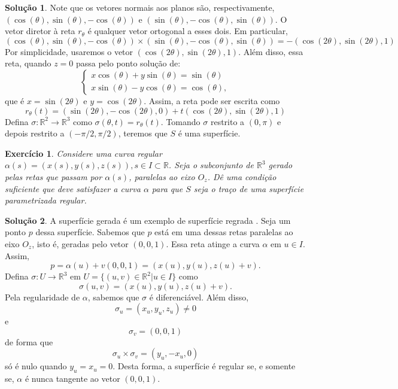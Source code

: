 \documentclass[a4paper,12pt]{article}
\newcommand{\R}{\mathbb{R}}
\theoremstyle{exer}
\newtheorem{exercise}{Exercício}
\theoremstyle{definition}
\newtheorem{solution}{Solução}
\theoremstyle{plain}
\begin{document}
\begin{solution}
    Note que os vetores normais aos planos são, respectivamente,
    $(\cos(\theta), \sin(\theta), -\cos(\theta))$ e $(\sin(\theta),
    -\cos(\theta), \sin(\theta))$. O vetor diretor à reta $r_{\theta}$ é
    qualquer vetor ortogonal a esses dois. Em particular, 
    $$
    (\cos(\theta), \sin(\theta), -\cos(\theta)) \times (\sin(\theta),
    -\cos(\theta), \sin(\theta)) = -(\cos(2\theta), \sin(2\theta), 1) 
    $$
    Por simplicidade, usaremos o vetor $(\cos(2\theta), \sin(2\theta), 1)$.
    Além disso, essa reta, quando $z = 0$ passa pelo ponto solução de:
    $$
    \begin{cases}
      x\cos(\theta) + y\sin(\theta) = \sin(\theta) \\
      x\sin(\theta) - y\cos(\theta) = \cos(\theta), 
    \end{cases}
    $$
    que é $x = \sin(2\theta)$ e $y = \cos(2\theta)$. Assim, a reta pode ser
    escrita como 
    $$
    r_{\theta}(t) = (\sin(2\theta), -\cos(2\theta), 0) + t(\cos(2\theta), \sin(2\theta), 1)
    $$
    Defina $\sigma : \R^2 \to \R^3$ como $\sigma(\theta, t) = r_{\theta}(t)$.
    Tomando $\sigma$ restrito a $(0,\pi)$ e depois restrito a $(-\pi/2,
    \pi/2)$, teremos que $S$ é uma superfície. 
\end{solution}

\begin{exercise}
    Considere uma curva regular $\alpha(s) = (x(s), y(s), z(s)), s \in I
    \subset \R$. Seja o subconjunto de $\R^3$ gerado pelas retas que passam
    por $\alpha(s)$, paralelas ao eixo $O_z$. Dê uma condição suficiente que
    deve satisfazer a curva $\alpha$ para que $S$ seja o traço de uma
    superfície parametrizada regular.
\end{exercise}

\begin{solution}
    A superfície gerada é um exemplo de superfície regrada \cite[Seção
    5.3]{pressley}. Seja um ponto $p$ dessa superfície. Sabemos que $p$ está
    em uma dessas retas paralelas ao eixo $O_z$, isto é, geradas pelo vetor
    $(0,0,1)$. Essa reta atinge a curva $\alpha$ em $u \in I$. Assim, 
    $$
    p = \alpha(u) + v(0,0,1) = (x(u), y(u), z(u) + v).
    $$
    Defina $\sigma : U \to \R^3$ em $U = \{(u,v) \in \R^2 | u \in I\}$ como 
    $$
    \sigma(u,v) = (x(u), y(u), z(u) + v).
    $$
    Pela regularidade de $\alpha$, sabemos que $\sigma$ é diferenciável. Além
    disso, 
    $$
    \sigma_u = (x_u, y_u, z_u) \neq 0
    $$
    e
    $$
    \sigma_v = (0,0,1)
    $$
    de forma que 
    $$
    \sigma_u \times \sigma_v = (y_u, -x_u, 0)
    $$
    só é nulo quando $y_u = x_u = 0$. Desta forma, a superfície é regular se, e
    somente se, $\alpha$ é nunca tangente ao vetor $(0,0,1)$. 

\end{solution}
\end{document}
